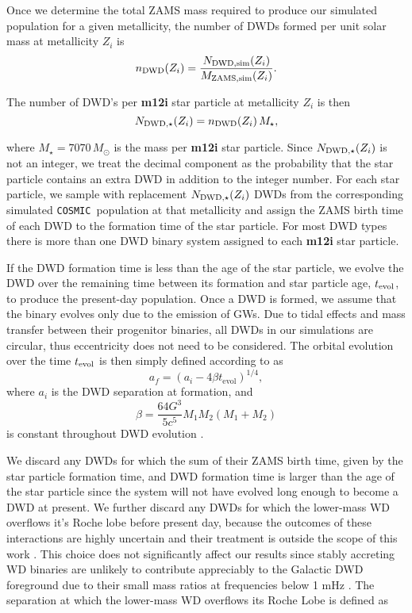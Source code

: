 \documentclass[twocolumn]{aastex631}
\newcommand{\cosmic}{\texttt{COSMIC}}
\begin{document}
Once we determine the total ZAMS mass required to produce our simulated population for a given metallicity, the number of DWDs formed per unit solar mass at metallicity $Z_i$ is
\begin{equation}
    n_{\rm{DWD}}(Z_i) = \frac{N_{\rm{DWD, sim}}(Z_i)}{M_{\rm{ZAMS, sim}}(Z_i)}.
\end{equation}

\noindent The number of DWD’s per \textbf{m12i} star particle at metallicity $Z_i$ is then
\begin{equation}
    N_{\rm{DWD},\star} (Z_i) = n_{\rm{DWD}}(Z_i)\, M_\star,
\end{equation}


\noindent where $M_\star = 7070\,M_\odot$ is the mass per \textbf{m12i} star particle. Since $N_{\rm{DWD},\star} (Z_i)$ is not an integer, we treat the decimal component as the probability that the star particle contains an extra DWD in addition to the integer number. For each star particle, we sample with replacement $N_{\rm{DWD},\star}(Z_i)$ DWDs from the corresponding simulated \cosmic\ population at that metallicity and assign the ZAMS birth time of each DWD to the formation time of the star particle. For most DWD types there is more than one DWD binary system assigned to each \textbf{m12i} star particle. 


If the DWD formation time is less than the age of the star particle, we evolve the DWD over the remaining time between its formation and star particle age, $t_{\rm{evol}}$, to produce the present-day population. Once a DWD is formed, we assume that the binary evolves only due to the emission of GWs. Due to tidal effects and mass transfer between their progenitor binaries, all DWDs in our simulations are circular, thus eccentricity does not need to be considered. The orbital evolution over the time $t_{\rm{evol}}$ is then simply defined according to \citet{Peters1964} as
\begin{equation}
    a_f = (a_i - 4\beta t_\text{evol})^{1/4},
\end{equation}
where $a_i$ is the DWD separation at formation, and 
\begin{equation}
    \beta = \frac{64G^3}{5c^5} M_1M_2(M_1+M_2)
\end{equation}
is constant throughout DWD evolution \citep{Peters1964}.

We discard any DWDs for which the sum of their ZAMS birth time, given by the star particle formation time, and DWD formation time is larger than the age of the star particle since the system will not have evolved long enough to become a DWD at present. We further discard any DWDs for which the lower-mass WD overflows it's Roche lobe before present day, because the outcomes of these interactions are highly uncertain and their treatment is outside the scope of this work \citep[e.g., ][]{Shen2015, Kremer2017}. This choice does not significantly affect our results since stably accreting WD binaries are unlikely to contribute appreciably to the Galactic DWD foreground due to their small mass ratios at frequencies below 1 mHz \citep{Breivik2018}. The separation at which the lower-mass WD overflows its Roche Lobe is defined as
\end{document}
